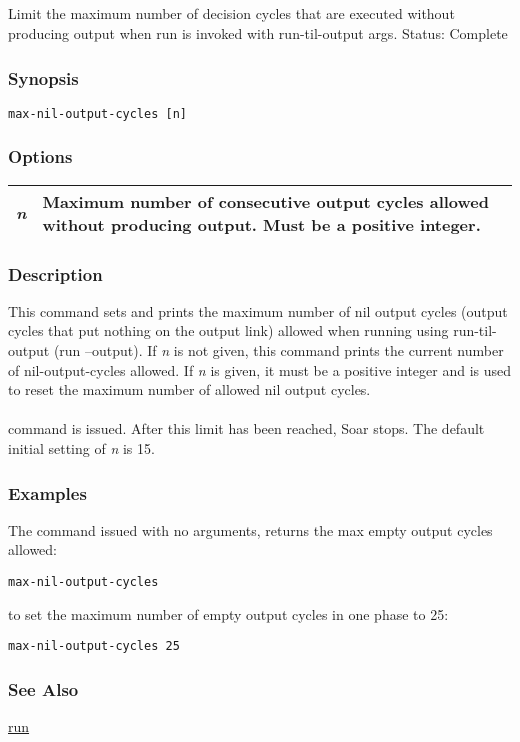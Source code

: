 \subsection{}
\label{max-nil-output-cycles}
Limit the maximum number of decision cycles that are executed without producing output when run is invoked with run-til-output args. 
 Status: Complete
\subsubsection*{Synopsis}
\begin{verbatim}
max-nil-output-cycles [n]
\end{verbatim}
\subsubsection*{Options}
\begin{tabular}{|l|l|}
\hline 
\emph{n}
 & Maximum number of consecutive output cycles allowed without producing output. Must be a positive integer.  \\
 \hline 
\end{tabular}
\subsubsection*{Description}
 This command sets and prints the maximum number of nil output cycles (output cycles that put nothing on the output link) allowed when running using run-til-output (run --output). If \emph{n}
 is not given, this command prints the current number of nil-output-cycles allowed. If \emph{n}
 is given, it must be a positive integer and is used to reset the maximum number of allowed nil output cycles. \\ 
\\ 
 command is issued. After this limit has been reached, Soar stops. The default initial setting of \emph{n}
 is 15. 
\subsubsection*{Examples}
 The command issued with no arguments, returns the max empty output cycles allowed: \begin{verbatim}
max-nil-output-cycles 
\end{verbatim}
 to set the maximum number of empty output cycles in one phase to 25: \begin{verbatim}
max-nil-output-cycles 25 
\end{verbatim}
\subsubsection*{See Also}
\hyperref[run]{run} 